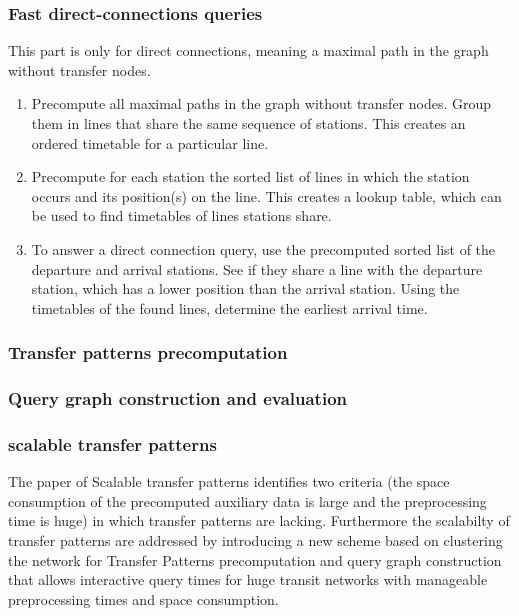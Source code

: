 \subsubsection{Fast direct-connections queries}
This part is only for direct connections, meaning a maximal path in the graph without transfer nodes.

\begin{enumerate}
    \item Precompute all maximal paths in the graph without transfer nodes. Group them in lines that share the same sequence of stations. This creates an ordered timetable for a particular line.
    \item Precompute for each station the sorted list of lines in which the station occurs and its position(s) on the line. This creates a lookup table, which can be used to find timetables of lines stations share.
    \item To answer a direct connection query, use the precomputed sorted list of the departure and arrival stations. See if they share a line with the departure station, which has a lower position than the arrival station. Using the timetables of the found lines, determine the earliest arrival time.
\end{enumerate}
\subsubsection{Transfer patterns precomputation}

\subsubsection{Query graph construction and evaluation}
\subsubsection{scalable transfer patterns}
The paper of Scalable transfer patterns \cite{bast_scalable_2015} identifies two criteria (the space consumption of the precomputed auxiliary data is large and the preprocessing time is huge) in which transfer patterns are lacking. Furthermore the scalabilty of transfer patterns are addressed by introducing a new scheme based on clustering the network for Transfer Patterns precomputation and query graph construction that allows interactive query times for huge transit networks with manageable preprocessing times and space consumption. 
\subsection{}
